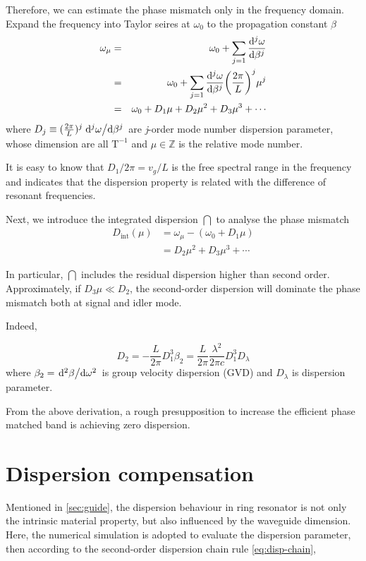 Therefore, we can estimate the phase mismatch only in the frequency domain. Expand the frequency into Taylor seires at $\omega_0$ to the propagation constant $\beta$
\begin{eqnarray}
  \omega_{\mu} & = & \omega_0 
  + \sum_{j=1}\dv[j]{\omega}{\beta} (\beta_{\mu}-\beta_0) \\
  & = & \omega_0 
  + \sum_{j=1}\dv[j]{\omega}{\beta} \qty(\frac{2 \pi}{L})^j \mu^j \nonumber \\
  & = & \omega_0 + D_1 \mu + D_2 \mu^2 + D_3 \mu^3 + \cdots \nonumber
\end{eqnarray}
where $D_j \equiv  (\frac{2 \pi}{L})^j\dv*[j]{\omega}{\beta}$ are \textit{j}-order mode number dispersion parameter, whose dimension are all $\mathrm{T}^{-1}$ and $\mu \in \mathbb{Z}$ is the relative mode number. 

It is easy to know that $D_1 / 2 \pi = v_g / L$ is the free spectral range in the frequency and indicates that the dispersion property is related with the difference of resonant frequencies.   

Next, we introduce the integrated dispersion $\dint$ \cite{Brasch2014a} to analyse the phase mismatch
\begin{align}\label{eq:def-dint}
    D_\mathrm{int}(\mu) &= \omega_{\mu} - (\omega_0 + D_1 \mu)  \\
    &= D_2 \mu^2 + D_3 \mu^3 + \cdots \nonumber
\end{align}

In particular, $\dint$ includes the residual dispersion higher than second order. Approximately, if $D_3 \mu \ll D_2$, the second-order dispersion will dominate the phase mismatch both at signal and idler mode.

Indeed, 

\begin{equation}\label{eq:disp-chain}
    D_2 = - \frac{L}{2\pi} {D_1^3}{\beta_2} = \frac{L}{2\pi}  \frac{\lambda^2}{2\pi c} {D_1^3} D_{\lambda}
\end{equation}
where $\beta_2=\dv*[2]{\beta}{\omega}$ is group velocity dispersion (GVD) and $D_{\lambda}$ is dispersion parameter.

From the above derivation, a rough presupposition to increase the efficient phase matched band is achieving zero dispersion.

\section{Dispersion compensation}
Mentioned in \autoref{sec:guide}, the dispersion behaviour in ring resonator is not only the intrinsic material property, but also influenced by the waveguide dimension. Here, the numerical simulation is adopted to evaluate the dispersion parameter, then according to the second-order dispersion chain rule \autoref{eq:disp-chain}, 


